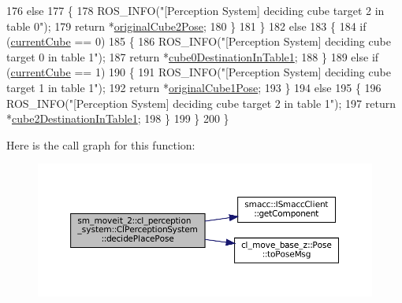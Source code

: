\begin{DoxyCode}
176             \textcolor{keywordflow}{else}
177             \{
178                 ROS\_INFO(\textcolor{stringliteral}{"[Perception System] deciding cube target 2 in table 0"});
179                 \textcolor{keywordflow}{return} *\hyperlink{classsm__moveit__2_1_1cl__perception__system_1_1ClPerceptionSystem_a8209f4f04c92db00f18da04327733e80}{originalCube2Pose};
180             \}
181         \}
182         \textcolor{keywordflow}{else}
183         \{
184             \textcolor{keywordflow}{if} (\hyperlink{classsm__moveit__2_1_1cl__perception__system_1_1ClPerceptionSystem_a88cc6bccad6938aa766511e79d16e69b}{currentCube} == 0)
185             \{
186                 ROS\_INFO(\textcolor{stringliteral}{"[Perception System] deciding cube target 0 in table 1"});
187                 \textcolor{keywordflow}{return} *\hyperlink{classsm__moveit__2_1_1cl__perception__system_1_1ClPerceptionSystem_aa5593ed0d791969bb398168e505722a6}{cube0DestinationInTable1};
188             \}
189             \textcolor{keywordflow}{else} \textcolor{keywordflow}{if} (\hyperlink{classsm__moveit__2_1_1cl__perception__system_1_1ClPerceptionSystem_a88cc6bccad6938aa766511e79d16e69b}{currentCube} == 1)
190             \{
191                 ROS\_INFO(\textcolor{stringliteral}{"[Perception System] deciding cube target 1 in table 1"});
192                 \textcolor{keywordflow}{return} *\hyperlink{classsm__moveit__2_1_1cl__perception__system_1_1ClPerceptionSystem_aa4225cf74f681a5d3ff302f62e1973b3}{originalCube1Pose};
193             \}
194             \textcolor{keywordflow}{else}
195             \{
196                 ROS\_INFO(\textcolor{stringliteral}{"[Perception System] deciding cube target 2 in table 1"});
197                 \textcolor{keywordflow}{return} *\hyperlink{classsm__moveit__2_1_1cl__perception__system_1_1ClPerceptionSystem_a6056364fa287555240bd5cbee19ae018}{cube2DestinationInTable1};
198             \}
199         \}
200     \}
\end{DoxyCode}
Here is the call graph for this function\+:
\nopagebreak
\begin{figure}[H]
\begin{center}
\leavevmode
\includegraphics[width=350pt]{classsm__moveit__2_1_1cl__perception__system_1_1ClPerceptionSystem_a7296c2e30c0c7401111c196e6043f26e_cgraph}
\end{center}
\end{figure}
